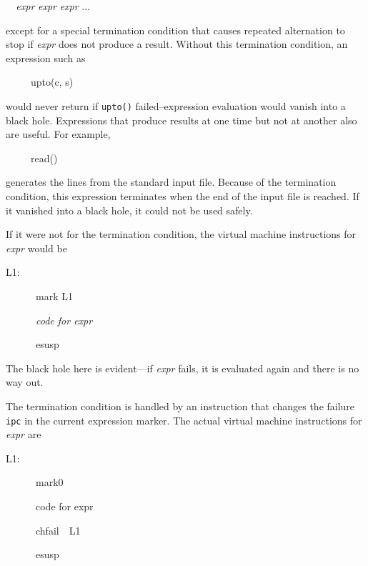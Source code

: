 {\ttfamily\mdseries
\textit{\ \ expr }{\textbar} \textit{expr }{\textbar} \textit{expr }{\textbar} ...}

\noindent except for a special termination condition that causes
repeated alternation to stop if \textit{expr} does not produce a
result. Without this termination condition, an expression such as

{\ttfamily\mdseries
\ \ \ \ \ {\textbar}upto(c, s)}

\noindent would never return if \texttt{upto()} failed--expression
evaluation would vanish into a {\textquotedbl}black
hole.{\textquotedbl} Expressions that produce results at one time but
not at another also are useful. For example,

{\ttfamily\mdseries
\ \ \ \ \ {\textbar}read()}

\noindent generates the lines from the standard input file. Because of
the termination condition, this expression terminates when the end of
the input file is reached. If it vanished into a {\textquotedbl}black
hole,{\textquotedbl} it could not be used safely.

If it were not for the termination condition, the virtual machine
instructions for \texttt{{\textbar}}\textit{expr} would be

{\ttfamily\mdseries
L1:}

{\ttfamily\mdseries
\ \ \ \ \ \ mark L1}

{\ttfamily\mdseries
\ \ \ \ \ \ \textit{code for expr}}

{\ttfamily\mdseries
\ \ \ \ \ \ esusp}


The {\textquotedbl}black hole{\textquotedbl} here is evident---if
\textit{expr} fails, it is evaluated again and there is no way out.

The termination condition is handled by an instruction that changes
the failure \texttt{ipc} in the current expression marker. The actual
virtual machine instructions for \texttt{{\textbar}}\textit{expr} are

{\ttfamily\mdseries
L1:}

{\ttfamily\mdseries
\ \ \ \ \ \ mark0}

{\ttfamily\mdseries
\ \ \ \ \ \ code for expr}

{\ttfamily\mdseries
\ \ \ \ \ \ chfail\ \ L1}

{\ttfamily\mdseries
\ \ \ \ \ \ esusp}


